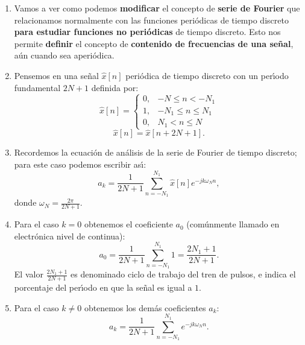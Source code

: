 \documentclass[11pt,a4paper,openany]{book}
\begin{document}
\begin{enumerate}
	\item Vamos a ver como podemos \textbf{modificar} el concepto de \textbf{serie de Fourier} que relacionamos normalmente con las funciones peri\'{o}dicas de tiempo discreto \textbf{para estudiar funciones no peri\'{o}dicas} de tiempo discreto. Esto nos permite \textbf{definir} el concepto de \textbf{contenido de frecuencias de una se\~{n}al}, a\'{u}n cuando sea aperi\'{o}dica.
	
	\item Pensemos en una se\~{n}al $\hat{x}[n]$ peri\'{o}dica de tiempo discreto con un per\'{\i}odo fundamental $2N + 1$ definida por:
	\begin{equation}
		\hat{x}[n] = 
		\begin{cases} 
			0, & -N \leq n < -N_{1} \\ 
			1, & -N_{1} \leq n \leq N_{1} \\ 
			0, & N_{1} < n \leq N 
		\end{cases}
	\end{equation}
	\begin{equation}
		\hat{x}[n] = \hat{x}[n + 2N + 1].
	\end{equation}
	
	\item Recordemos la ecuaci\'{o}n de an\'{a}lisis de la serie de Fourier de tiempo discreto; para este caso podemos escribir as\'{\i}:
	\begin{equation}
		a_{k} = \frac{1}{2N + 1} \sum_{n=-N_{1}}^{N_{1}} \hat{x}[n] e^{-jk\omega_{N}n},
	\end{equation}
	donde $\omega_{N} = \frac{2\pi}{2N + 1}$.
	
	\item Para el caso $k=0$ obtenemos el coeficiente $a_{0}$ (com\'{u}nmente llamado en electr\'{o}nica nivel de continua):
	\begin{equation}
		a_{0} = \frac{1}{2N + 1} \sum_{n=-N_{1}}^{N_{1}} 1 = \frac{2N_{1} + 1}{2N + 1}.
	\end{equation}
	El valor $\frac{2N_{1} + 1}{2N + 1}$ es denominado ciclo de trabajo del tren de pulsos, e indica el porcentaje del per\'{\i}odo en que la se\~{n}al es igual a $1$.
	
	\item Para el caso $k \neq 0$ obtenemos los dem\'{a}s coeficientes $a_{k}$:
	\begin{equation}
		a_{k} = \frac{1}{2N + 1} \sum_{n=-N_{1}}^{N_{1}} e^{-jk\omega_{N}n}.
	\end{equation}
	

\end{enumerate}
\end{document}
